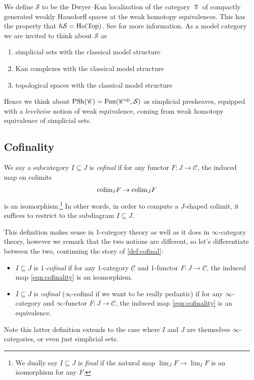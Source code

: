 \documentclass[11pt,openany]{book}
\renewcommand{\Pre}{\mathrm{PSh}}
\begin{document}
\begin{example} We define $\mathcal{S}$ to be the Dwyer--Kan localization of the category $\Top$ of compactly generated weakly Hausdorff spaces at the weak homotopy equivalences. This has the property that $h \mathcal{S} = \mathrm{Ho}(\mathrm{Top})$. See \cite[\S1.2.16]{HTT} for more information. As a model category we are invited to think about $\mathcal{S}$ as
\begin{enumerate}
    \item simplicial sets with the classical model structure
    \item Kan complexes with the classical model structure
    \item topological spaces with the classical model structure
\end{enumerate}
Hence we think about $\Pre(\mathscr{C}) = \Fun(\mathscr{C}^\op, \mathcal{S})$ as simplicial presheaves, equipped with a \textit{levelwise} notion of weak equivalence, coming from weak homotopy equivalence of simplicial sets.
\end{example}

\subsection{Cofinality}
\begin{definition}\label{def:cofinal} 
We say a subcategory $I \subseteq J$ is \textit{cofinal} if for any functor $F \colon J \to \mathscr{C}$, the induced map on colimits
\begin{equation}\label{eqn:cofinality}
\begin{aligned}
    \mathrm{colim}_I F \to \mathrm{colim}_J F
\end{aligned}
\end{equation}
is an isomorphism.\footnote{%
We dually say $I \subseteq J$ is \textit{final} if the natural map $\lim_J F \to \lim_I F$ is an isomorphism for any $F$.%
}
In other words, in order to compute a $J$-shaped colimit, it suffices to restrict to the subdiagram $I \subseteq J$.
\end{definition}

\begin{remark} This definition makes sense in 1-category theory as well as it does in $\infty$-category theory, however we remark that the two notions are different, so let's differentiate between the two, continuing the story of \autoref{def:cofinal}:
\begin{itemize}
    \item $I \subseteq J$ is $1$\textit{-cofinal} if for any $1$-category $\mathscr{C}$ and $1$-functor $F \colon J \to \mathscr{C}$, the induced map \autoref{eqn:cofinality} is an isomorphism.
    \item $I \subseteq J$ is \textit{cofinal} ($\infty$-cofinal if we want to be really pedantic) if for any $\infty$-category and $\infty$-functor $F \colon J \to \mathscr{C}$, the induced map \autoref{eqn:cofinality} is an equivalence.
\end{itemize}
Note this latter definition extends to the case where $I$ and $J$ are themselves $\infty$-categories, or even just simplicial sets.
\end{remark}
\end{document}
